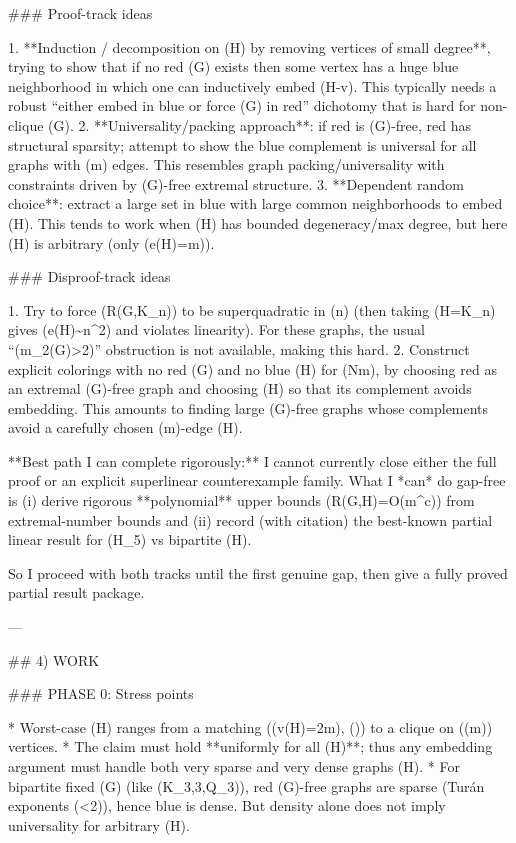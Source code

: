 ### Proof-track ideas

1. **Induction / decomposition on (H) by removing vertices of small degree**, trying to show that if no red (G) exists then some vertex has a huge blue neighborhood in which one can inductively embed (H-v). This typically needs a robust “either embed in blue or force (G) in red” dichotomy that is hard for non-clique (G).
2. **Universality/packing approach**: if red is (G)-free, red has structural sparsity; attempt to show the blue complement is universal for all graphs with (m) edges. This resembles graph packing/universality with constraints driven by (G)-free extremal structure.
3. **Dependent random choice**: extract a large set in blue with large common neighborhoods to embed (H). This tends to work when (H) has bounded degeneracy/max degree, but here (H) is arbitrary (only (e(H)=m)).

### Disproof-track ideas

1. Try to force (R(G,K_n)) to be superquadratic in (n) (then taking (H=K_n) gives (e(H)\sim n^2) and violates linearity). For these graphs, the usual “(m_2(G)>2)” obstruction is not available, making this hard.
2. Construct explicit colorings with no red (G) and no blue (H) for (N\gg m), by choosing red as an extremal (G)-free graph and choosing (H) so that its complement avoids embedding. This amounts to finding large (G)-free graphs whose complements avoid a carefully chosen (m)-edge (H).

**Best path I can complete rigorously:** I cannot currently close either the full proof or an explicit superlinear counterexample family. What I *can* do gap-free is (i) derive rigorous **polynomial** upper bounds (R(G,H)=O(m^c)) from extremal-number bounds and (ii) record (with citation) the best-known partial linear result for (H_5) vs bipartite (H).

So I proceed with both tracks until the first genuine gap, then give a fully proved partial result package.

---

## 4) WORK

### PHASE 0: Stress points

* Worst-case (H) ranges from a matching ((v(H)=2m), ()) to a clique on (\Theta(\sqrt m)) vertices.
* The claim must hold **uniformly for all (H)**; thus any embedding argument must handle both very sparse and very dense graphs (H).
* For bipartite fixed (G) (like (K_{3,3},Q_3)), red (G)-free graphs are sparse (Turán exponents (<2)), hence blue is dense. But density alone does not imply universality for arbitrary (H).

